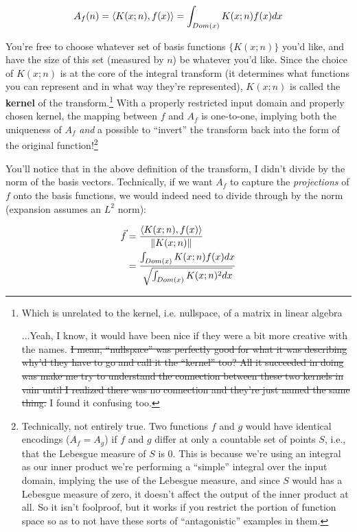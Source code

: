 \documentclass[letterpaper,12pt]{report}
\begin{document}
\[A_f(n) = \left<K(x;n),f(x)\right> 
  = \int_{Dom(x)} K(x;n) f(x) dx \]

You're free to choose whatever set of basis functions
\(\{K(x;n)\}\) you'd like, and have the size of this set
(measured by \(n\)) be whatever you'd like.
Since the choice of \(K(x;n)\) is at the core of
the integral transform (it determines what functions you
can represent and in what way they're represented),
\(K(x;n)\) is called the 
\textbf{kernel}
of the transform.\footnote{
  Which is unrelated to the kernel, i.e. nullspace, of a matrix in linear algebra\par
  ...Yeah, I know, it would have been nice if they were a
  bit more creative with the names. 
  \sout{I mean, ``nullspace''
  was perfectly good for what it was describing \textemdash{}
  why'd they have to go and call it the ``kernel'' too?
  All it succeeded in doing was make me try to understand
  the connection between these two kernels in vain until
  I realized there was no connection and they're just
  named the same thing.}
  I found it confusing too.
}
With a properly restricted input domain and properly
chosen kernel, the mapping between \(f\) and \(A_f\)
is one-to-one, implying both the uniqueness of \(A_f\)
\emph{and} a possible to ``invert'' the transform
back into the form of the original function!\footnote{
  Technically, not entirely true.
  Two functions \(f\) and \(g\) would have identical encodings
  (\(A_f = A_g\)) if \(f\) and \(g\)
  differ at only a countable set of points \(S\),
  i.e., that the Lebesgue measure of \(S\) is 0.
  This is because we're using an integral as our inner product
  \textemdash{}
  we're performing a ``simple'' integral over the input domain,
  implying the use of the Lebesgue measure,
  and since \(S\) would has a Lebesgue measure of zero,
  it doesn't affect the output of the inner product at all.
  So it isn't foolproof, but it works if you restrict
  the portion of function space so as to not have
  these sorts of ``antagonistic'' examples in them.
}\par

You'll notice that in the above definition of the transform,
I didn't divide by the norm of the basis vectors.
Technically, if we want \(A_f\) to capture the \emph{projections}
of \(f\) onto the basis functions, we would indeed need
to divide through by the norm
(expansion assumes an \(L^2\) norm):

\[\begin{split}
  \vec{f} &= \frac{\left<K(x;n),f(x)\right>}{\norm{K(x;n)}} \\
  &= \frac {\int_{Dom(x)} K(x;n) f(x) dx } {\sqrt{\int_{Dom(x)} K(x;n)^2 dx }}
\end{split}
\]
\end{document}
